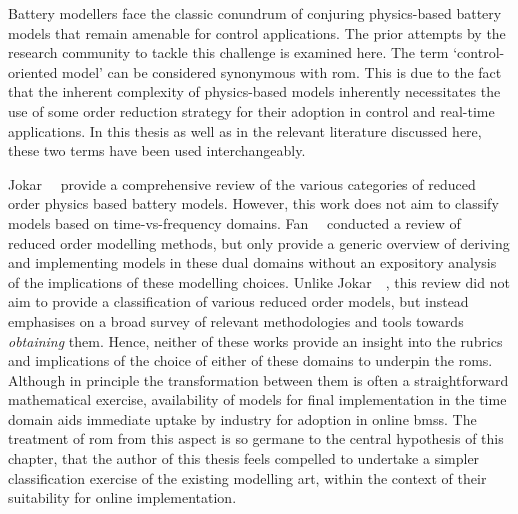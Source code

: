 
Battery modellers face the classic  conundrum of conjuring physics-based battery
models that remain amenable for control  applications. The prior attempts by the
research  community  to  tackle  this  challenge  is  examined  here.  The  term
`control-oriented model'  can be considered  synonymous with \gls{rom}.  This is
due to the fact that the  inherent complexity of physics-based models inherently
necessitates the  use of  some order  reduction strategy  for their  adoption in
control and  real-time applications. In this  thesis as well as  in the relevant
literature discussed here, these two terms have been used interchangeably.


Jokar~\etal~\cite{Jokar2016}  provide  a  comprehensive review  of  the  various
categories  of  reduced  order  physics  based  battery  models.  However,  this
work  does  not aim  to  classify  models  based on  time-vs-frequency  domains.
Fan~\etal{}~\cite{Fan2015}  conducted  a  review   of  reduced  order  modelling
methods, but only provide a generic overview of deriving and implementing models
in these  dual domains  without an  expository analysis  of the  implications of
these modelling  choices. Unlike  Jokar~\etal~\cite{Jokar2016}, this  review did
not aim to provide a classification of various reduced order models, but instead
emphasises  on  a broad  survey  of  relevant  methodologies and  tools  towards
\emph{obtaining} them.  Hence, neither  of these works  provide an  insight into
the  rubrics and  implications  of the  choice  of either  of  these domains  to
underpin  the  \glspl{rom}. Although  in  principle  the transformation  between
them  is  often  a straightforward  mathematical  exercise,  availability of models for final  implementation in the time domain aids
immediate uptake by  industry for adoption in online  \glspl{bms}. The treatment
of \gls{rom} from  this aspect is so  germane to the central  hypothesis of this
chapter, that the author
of this thesis feels compelled to undertake a simpler classification exercise of
the existing modelling  art, within the context of their  suitability for online
implementation.


